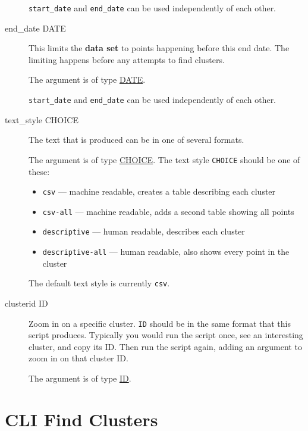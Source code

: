 \begin{description}
\texttt{start\_date} and \texttt{end\_date} can be used independently of
each other.

\item[end\_date DATE]
\hypertarget{cluster-end-date}{}

This limits the \textbf{data set} to points happening before this end
date. The limiting happens before any attempts to find clusters.

The argument is of type \hyperlink{argument-type-date}{DATE}.

\texttt{start\_date} and \texttt{end\_date} can be used independently of
each other.

\item[text\_style CHOICE]
\hypertarget{cluster-text-style}{}

The text that is produced can be in one of several formats.

The argument is of type \hyperlink{argument-type-choice}{CHOICE}. The text
style \texttt{CHOICE} should be one of these:

\begin{itemize}
\item \verb=csv= --- machine readable, creates a table describing each cluster
\item \verb=csv-all= --- machine readable, adds a second table showing all points
\item \verb=descriptive= --- human readable, describes each cluster
\item \verb=descriptive-all= --- human readable, also shows every point in the cluster
\end{itemize}

The default text style is currently \texttt{csv}.

\item[clusterid ID]
\hypertarget{cluster-clusterid}{}

Zoom in on a specific cluster. \texttt{ID} should be in the same format
that this script produces. Typically you would run the script once,
see an interesting cluster, and copy its ID. Then run the script
again, adding an argument to zoom in on that cluster ID.

The argument is of type \hyperlink{argument-type-id}{ID}.


\end{description}


\section{CLI Find Clusters}

